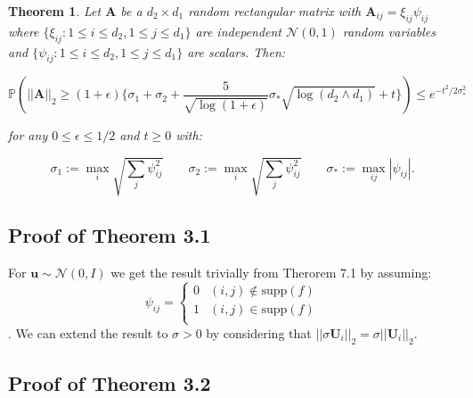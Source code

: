 \documentclass{article} %
\newtheorem{theorem}{Theorem}[section]
\theoremstyle{definition}
\begin{document}
\begin{theorem}
Let $\boldsymbol{A}$ be a $d_2 \times d_1$ random rectangular matrix with $\boldsymbol{A}_{ij} = \xi_{ij} \psi_{ij}$ where $ \{ \xi_{ij}:1 \leq i \leq d_2 , 1\leq j \leq d_1 \} $ are independent $ \mathcal{N}(0,1)$ random variables and $\{ \psi_{ij}:1 \leq i \leq d_2 , 1\leq j \leq d_1 \}$ are scalars. Then:

\begin{equation}
\mathbb{P}(||\boldsymbol{A}||_2 \geq (1+\epsilon) \{ \sigma_1 + \sigma_2 + \frac{5}{\sqrt{\log (1+\epsilon)} }\sigma_* \sqrt{\log (d_2 \wedge d_1)}  + t  \} ) \leq e^{-t^2 / 2 \sigma_*^2 }
\end{equation}

for any $0 \leq \epsilon \leq 1/2$ and  $t \geq 0$ with:

\begin{equation}
\sigma_1:= \max_i \sqrt{ \sum_j \psi_{ij}^2 } \qquad \sigma_2:= \max_i \sqrt{ \sum_j \psi_{ij}^2 } \qquad \sigma_*:= \max_{ij}|\psi_{ij}|.
\end{equation}
\end{theorem}

\subsection{Proof of Theorem 3.1}
For $\boldsymbol{u} \sim \mathcal{N}(0, I)$ we get the result trivially from Therorem 7.1 by assuming: 
\begin{equation}
\psi_{ij} = 
\begin{cases} 
      0 & (i,j)\notin \text{supp}(f) \\
      1 & (i,j)\in \text{supp}(f) \\
\end{cases}
\end{equation}
. We can extend the result to $\sigma > 0$ by considering that $||\sigma \boldsymbol{U}_i ||_2 = \sigma||\boldsymbol{U}_i ||_2$.


\subsection{Proof of Theorem 3.2}
\end{document}
